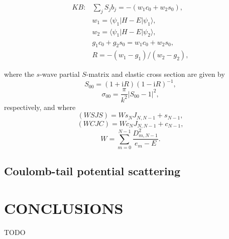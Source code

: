 \documentclass[aip
, pra
, showpacs
, aps
, twocolumn
, groupedaddress
, floatfix
]{revtex4}
\newcommand{\beq}{\begin{equation}}
\newcommand{\eeq}{\end{equation}}
\newcommand{\barr}{\begin{array}}
\newcommand{\earr}{\end{array}}
\begin{document}
\beq \barr{rl}
KB: & \sum_j S_{j} b_j = - (w_1 c_0 +  w_2 s_0), \\
 & w_1  = \langle \psi_1 |H-E| \psi_1 \rangle,\\
 & w_2 = \langle \psi_1 |H-E| \psi_2 \rangle,\\
 & g_1 c_0 + g_2 s_0 = w_1 c_0 +  w_2 s_0,\\
 & R = -(w_1 - g_1) / (w_2 - g_2),
\earr \eeq

where the $s$-wave partial $S$-matrix and elastic cross section are given by
\beq
S_{00}=(1+\mbox{i}R)(1-\mbox{i}R)^{-1},
\eeq
\beq
\sigma_{00}=\frac{\pi}{k^2} |S_{00}-1|^2,
\eeq
respectively, and where
\beq
(WSJS) = W s_N J_{N,N-1} + s_{N-1},
\eeq
\beq
(WCJC) = W c_N J_{N,N-1} + c_{N-1},
\eeq
\beq
W= \sum_{m=0}^{N-1} \frac{D_{m,N-1}^2}{e_m-E}.
\label{g}
\eeq

\subsection{Coulomb-tail potential scattering}



\section{CONCLUSIONS}
TODO


\begin{acknowledgments}
\end{acknowledgments}





%
\end{document}
